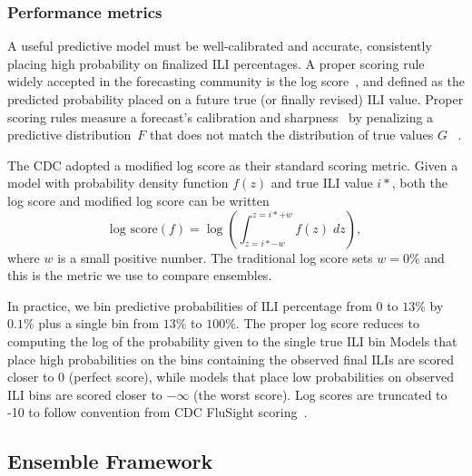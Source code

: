 \documentclass[sagev,times,Review,10pt]{sagej}
\def\l{\left}
\def\r{\right}
\begin{document}
\subsubsection{Performance metrics} \label{performanceMetrics}
A useful predictive model must be well-calibrated and accurate, consistently placing high probability on finalized ILI percentages.
A proper scoring rule~\citep{dawid2014theory} widely accepted in the forecasting community is the log score~\citep{dawid2014theory,reich2019collaborativepnas}, and defined as the predicted probability placed on a future true (or finally revised) ILI value.
Proper scoring rules measure a forecast's calibration and sharpness~\citep{gneiting2007probabilistic,winkler1977rewarding} by penalizing a predictive distribution~$F$ that does not match the distribution of true values $G$~\citep{gneiting2007probabilistic} . 

The CDC adopted a modified log score as their standard scoring metric.
Given a model with probability density function $f(z)$ and true ILI value $i*$, both the log score and modified log score can be written
\begin{equation}
  \text{log score}\l(f\r) = \log \l( \int_{z = i*-w}^{z=i*+w}f(z)\; dz \r), \label{analyLogScore}
\end{equation}
where $w$ is a small positive number.
The traditional log score sets $w=0\%$ and this is the metric we use to compare ensembles.

In practice, we bin predictive probabilities of ILI percentage from $0$ to $13\%$ by $0.1\%$ plus a single bin from $13\%$ to $100\%$.
The proper log score reduces to computing the log of the probability given to the single true ILI bin
Models that place high probabilities on the bins containing the observed final ILIs are scored closer to $0$ (perfect score), while models that place low probabilities on observed ILI bins are scored closer to $-\infty$ (the worst score).
Log scores are truncated to -10 to follow convention from CDC FluSight scoring~\citep{mcgowan2019collaborative}.

\subsection{Ensemble Framework}
\end{document}
